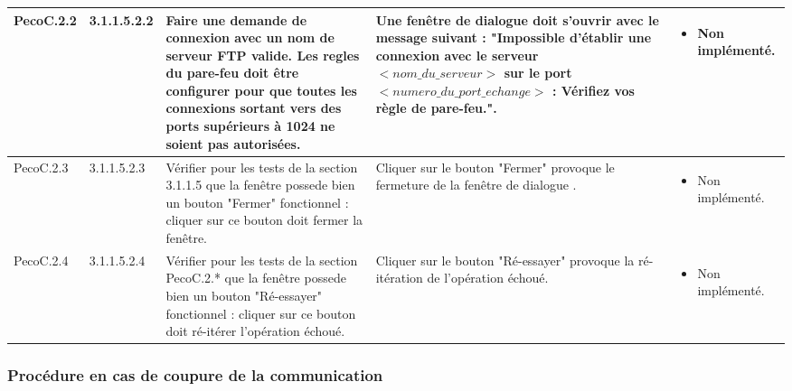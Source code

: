 \documentclass[10pt,a4paper,landscape]{report}
\begin{document}
\begin{center}
\begin{tabular}{|p{2.5cm}|p{2cm}|p{8cm}|p{8cm}|p{5cm}|}
		\hline
		PecoC.2.2 & 3.1.1.5.2.2 & Faire une demande de connexion avec un nom de serveur FTP valide. Les regles du pare-feu doit être configurer pour que toutes les connexions sortant vers des ports supérieurs à 1024 ne soient pas autorisées.& Une fenêtre de dialogue doit s'ouvrir avec le message suivant :   "Impossible d'établir une connexion avec le serveur $< nom\_du\_serveur>$ sur le port $< numero\_du\_port\_echange>$ : Vérifiez vos règle de pare-feu.".&\vspace*{-0.2cm} \begin{itemize}[label=$\ast$] \item \textcolor{false}{Non implémenté.}\end{itemize}\\
		\hline
		PecoC.2.3 & 3.1.1.5.2.3 & Vérifier pour les tests de la section 3.1.1.5 que la fenêtre possede bien un bouton "Fermer" fonctionnel :  cliquer sur ce bouton doit fermer la fenêtre.& Cliquer sur le bouton "Fermer" provoque le fermeture de la fenêtre de dialogue .&\vspace*{-0.2cm} \begin{itemize}[label=$\ast$] \item \textcolor{false}{Non implémenté.}\end{itemize}\\
		\hline
		PecoC.2.4 & 3.1.1.5.2.4 & Vérifier pour les tests de la section PecoC.2.* que la fenêtre possede bien un bouton "Ré-essayer" fonctionnel :  cliquer sur ce bouton doit ré-itérer l'opération échoué.& Cliquer sur le bouton "Ré-essayer" provoque la ré-itération de l'opération échoué.&\vspace*{-0.2cm} \begin{itemize}[label=$\ast$] \item \textcolor{false}{Non implémenté.}\end{itemize}\\
		\hline
	\end{tabular}
	\egroup
\end{center}

\subsubsection{Procédure en cas de coupure de la communication}
\end{document}
